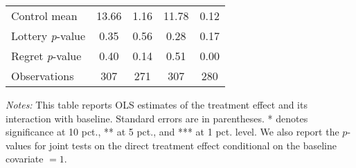\begin{table}[htbp]
{\begin{threeparttable}
\begin{tabular}{l*{4}{c}}
Control mean    &    13.66         &     1.16         &    11.78         &     0.12         \\
Lottery \emph{p}-value&     0.35         &     0.56         &     0.28         &     0.17         \\
Regret \emph{p}-value&     0.40         &     0.14         &     0.51         &     0.00         \\
Observations    &      307         &      271         &      307         &      280         \\
\bottomrule \end{tabular} \begin{tablenotes}[flushleft] \footnotesize \item \emph{Notes:} This table reports OLS estimates of the treatment effect and its interaction with baseline. Standard errors are in parentheses. * denotes significance at 10 pct., ** at 5 pct., and *** at 1 pct. level. We also report the \(p\)-values for joint tests on the direct treatment effect conditional on the baseline covariate $= 1$. \end{tablenotes} \end{threeparttable} } \end{table}

